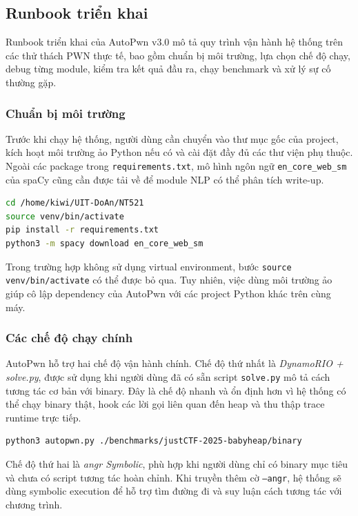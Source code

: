 \documentclass[final]{hcmuitthesis}
\begin{document}
\subsection{Runbook triển khai}
Runbook triển khai của AutoPwn v3.0 mô tả quy trình vận hành hệ thống trên các thử thách PWN thực tế, bao gồm chuẩn bị môi trường, lựa chọn chế độ chạy, debug từng module, kiểm tra kết quả đầu ra, chạy benchmark và xử lý sự cố thường gặp.

\subsubsection{Chuẩn bị môi trường}
Trước khi chạy hệ thống, người dùng cần chuyển vào thư mục gốc của project, kích hoạt môi trường ảo Python nếu có và cài đặt đầy đủ các thư viện phụ thuộc. Ngoài các package trong \texttt{requirements.txt}, mô hình ngôn ngữ \texttt{en\_core\_web\_sm} của spaCy cũng cần được tải về để module NLP có thể phân tích write-up.

\begin{lstlisting}[language=bash]
cd /home/kiwi/UIT-DoAn/NT521
source venv/bin/activate
pip install -r requirements.txt
python3 -m spacy download en_core_web_sm
\end{lstlisting}

Trong trường hợp không sử dụng virtual environment, bước \texttt{source venv/bin/activate} có thể được bỏ qua. Tuy nhiên, việc dùng môi trường ảo giúp cô lập dependency của AutoPwn với các project Python khác trên cùng máy.

\subsubsection{Các chế độ chạy chính}
AutoPwn hỗ trợ hai chế độ vận hành chính. Chế độ thứ nhất là \textit{DynamoRIO + solve.py}, được sử dụng khi người dùng đã có sẵn script \texttt{solve.py} mô tả cách tương tác cơ bản với binary. Đây là chế độ nhanh và ổn định hơn vì hệ thống có thể chạy binary thật, hook các lời gọi liên quan đến heap và thu thập trace runtime trực tiếp.

\begin{lstlisting}[language=bash]
python3 autopwn.py ./benchmarks/justCTF-2025-babyheap/binary
\end{lstlisting}

Chế độ thứ hai là \textit{angr Symbolic}, phù hợp khi người dùng chỉ có binary mục tiêu và chưa có script tương tác hoàn chỉnh. Khi truyền thêm cờ \texttt{--angr}, hệ thống sẽ dùng symbolic execution để hỗ trợ tìm đường đi và suy luận cách tương tác với chương trình.
\end{document}
